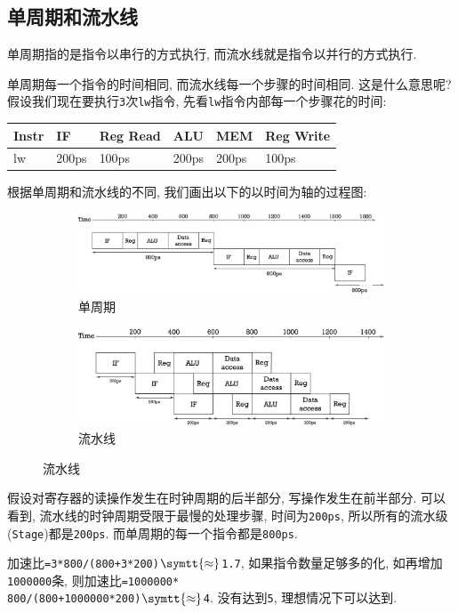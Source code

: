 \subsection{单周期和流水线}
单周期指的是指令以串行的方式执行, 而流水线就是指令以并行的方式执行. \par
单周期每一个指令的时间相同, 而流水线每一个步骤的时间相同. 这是什么意思呢? 假设我们现在要执行\verb|3|次\verb|lw|指令, 先看\verb|lw|指令内部每一个步骤花的时间:
\begin{table}[H]
\centering
\begin{tabularx}{\textwidth}{|Z|Z|Z|Z|Z|Z|}
\hline
\textbf{Instr} & \textbf{IF} & \textbf{Reg Read} & \textbf{ALU} & \textbf{MEM} & \textbf{Reg Write} \\ \hline
lw & 200ps & 100ps & 200ps & 200ps & 100ps \\
\hline
\end{tabularx}
\end{table}
根据单周期和流水线的不同, 我们画出以下的以时间为轴的过程图:
\begin{figure}[H]
\centering
\begin{subfigure}{\textwidth}
\centering
\includegraphics[scale=.4]{img/figure38.pdf}
\caption{单周期}
\end{subfigure}\vspace{2em}
\begin{subfigure}{\textwidth}
\centering
\includegraphics[scale=.4]{img/figure39.pdf}
\caption{流水线}
\end{subfigure}
\end{figure}
假设对寄存器的读操作发生在时钟周期的后半部分, 写操作发生在前半部分. 可以看到, 流水线的时钟周期受限于最慢的处理步骤, 时间为\verb|200ps|, 所以所有的流水级(\verb|Stage|)都是\verb|200ps|. 而单周期的每一个指令都是\verb|800ps|.\par
加速比\verb|=3*800/(800+3*200)|$ \symtt{\approx} $\verb|1.7|, 如果指令数量足够多的化, 如再增加\verb|1000000|条, 则加速比\verb|=1000000*|\\\verb|800/(800+1000000*200)|$ \symtt{\approx} $\verb|4|. 没有达到\verb|5|, 理想情况下可以达到.\par 
